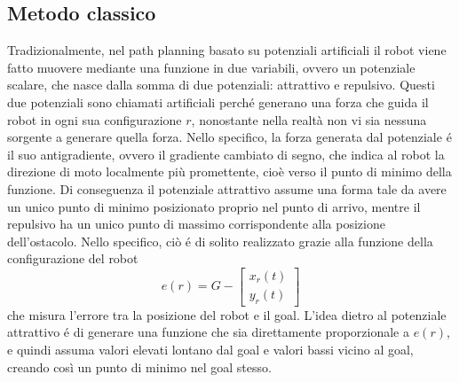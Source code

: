 \documentclass[14pt,a4paper]{extarticle}
\begin{document}
\subsection{Metodo classico}
Tradizionalmente, nel path planning basato su potenziali artificiali il robot viene fatto muovere mediante una funzione in due variabili, ovvero un potenziale scalare, che nasce dalla somma di due potenziali: attrattivo e repulsivo. Questi due potenziali sono chiamati artificiali perché generano una forza che guida il robot in ogni sua configurazione \(r\), nonostante nella realtà non vi sia nessuna sorgente a generare quella forza. Nello specifico, la forza generata dal potenziale é il suo antigradiente, ovvero il gradiente cambiato di segno, che indica al robot la direzione di moto localmente più promettente\cite{oriolo}, cioè verso il punto di minimo della funzione. Di conseguenza il potenziale attrattivo assume una forma tale da avere un unico punto di minimo posizionato proprio nel punto di arrivo, mentre il repulsivo ha un unico punto di massimo corrispondente alla posizione dell'ostacolo. Nello specifico, ciò é di solito realizzato grazie alla funzione della configurazione del robot
\begin{equation}
e(r) = G - \begin{bmatrix} x_r(t)\\ y_r(t) \end{bmatrix}
\end{equation}
che misura l'errore tra la posizione del robot e il goal. L'idea dietro al potenziale attrattivo é di generare una funzione che sia direttamente proporzionale a \(e(r)\), e quindi assuma valori elevati lontano dal goal e valori bassi vicino al goal, creando così un punto di minimo nel goal stesso.
\end{document}
